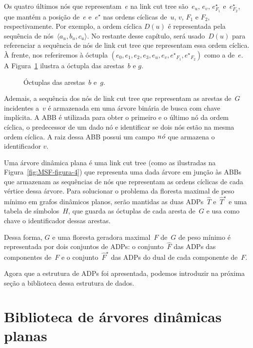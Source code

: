 Os quatro últimos nós que representam~$e$ na link cut tree são~$e_u$, $e_v$, $e^\star_{F_1}$ e~$e^\star_{F_2}$, que mantém a posição de~$e$ e~$e^\star$ nas ordens cíclicas de~$u$, $v$, $F_1$ e $F_2$, respectivamente.
Por exemplo, a ordem cíclica $D(u)$ é representada pela sequência de nós~$\langle a_u, b_u, c_u\rangle$.
No restante desse capítulo, será usado~$D(u)$ para referenciar a sequência de nós de link cut tree que representam essa ordem cíclica.
À frente, nos referiremos à óctupla $( e_0, e_1, e_2, e_3, e_u, e_v, {e^\star}_{F_1}, {e^\star}_{F_2})$ como a  de~$e$.
A Figura~\ref{fig:MSF-octo} ilustra a óctupla das arestas~$b$ e $g$.


\begin{figure}[htb]
\centering

\caption{Óctuplas das arestas~$b$ e~$g$.}
\label{fig:MSF-octo}
\end{figure}


Ademais, a sequência dos nós de link cut tree que representam as arestas de~$G$ incidentes a~$v$ é armazenada em uma árvore binária de busca com chave implícita.
A ABB é utilizada para obter o primeiro e o último nó da ordem cíclica, o predecessor de um dado nó e identificar se dois nós estão na mesma ordem cíclica.
A raiz dessa ABB possui um campo $\mathit{n\acute{o}}$ que armazena o identificador $v$.

Uma árvore dinâmica plana é uma link cut tree (como as ilustradas na Figura~\ref{fig:MSF-figura-4}) que representa uma dada árvore em junção às ABBs que armazenam as sequências de nós que representam as ordens cíclicas de cada vértice dessa árvore.
Para solucionar o problema da floresta maximal de peso mínimo em grafos dinâmicos planos, serão mantidas as duas ADPs~$\hat T$ e~$\hat T^\star$ e uma tabela de símbolos~$H$, que guarda as óctuplas de cada aresta de~$G$ e usa como chave o identificador dessas arestas.


Dessa forma, $G$ e uma floresta geradora maximal~$F$ de~$G$ de peso mínimo é representada por dois conjuntos de ADPs: o conjunto~$\hat F$ das ADPs das componentes de~$F$ e o conjunto~$\hat F^\star$ das ADPs do dual de cada componente de~$F$.

Agora que a estrutura de ADPs foi apresentada, podemos introduzir na próxima seção a biblioteca dessa estrutura de dados.

\section{Biblioteca de árvores dinâmicas planas}
\label{sec:EODT}

